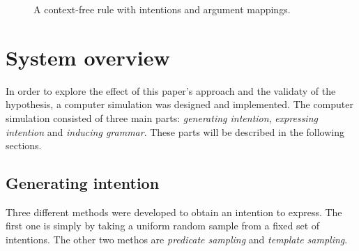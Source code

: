 \documentclass[a4paper]{article}
\begin{document}
\begin{figure}[h!]
\centering
{}
\caption{A context-free rule with intentions and argument mappings.}
\label{fig:rule}
\end{figure}

\section{System overview}
\label{sec:system_overview}
In order to explore the effect of this paper's approach and the validaty of the hypothesis, a computer simulation was designed and implemented. The computer simulation consisted of three main parts: \emph{generating intention}, \emph{expressing intention} and \emph{inducing grammar}. These parts will be described in the following sections.
\subsection{Generating intention}
\label{ssec:Generating intention}
Three different methods were developed to obtain an intention to express. The first one is simply by taking a uniform random sample from a fixed set of intentions. The other two methos are \emph{predicate sampling} and \emph{template sampling}.
\end{document}
